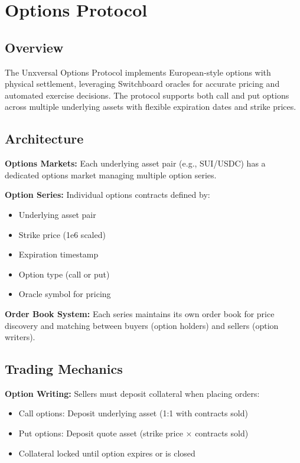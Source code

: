 \documentclass[12pt]{article}
\begin{document}
\section{Options Protocol}

\subsection{Overview}

The Unxversal Options Protocol implements European-style options with physical settlement, leveraging Switchboard oracles for accurate pricing and automated exercise decisions. The protocol supports both call and put options across multiple underlying assets with flexible expiration dates and strike prices.

\subsection{Architecture}

\textbf{Options Markets:} Each underlying asset pair (e.g., SUI/USDC) has a dedicated options market managing multiple option series.

\textbf{Option Series:} Individual options contracts defined by:
\begin{itemize}
    \item Underlying asset pair
    \item Strike price (1e6 scaled)
    \item Expiration timestamp
    \item Option type (call or put)
    \item Oracle symbol for pricing
\end{itemize}

\textbf{Order Book System:} Each series maintains its own order book for price discovery and matching between buyers (option holders) and sellers (option writers).

\subsection{Trading Mechanics}

\textbf{Option Writing:} Sellers must deposit collateral when placing orders:
\begin{itemize}
    \item Call options: Deposit underlying asset (1:1 with contracts sold)
    \item Put options: Deposit quote asset (strike price × contracts sold)
    \item Collateral locked until option expires or is closed
\end{itemize}
\end{document}
